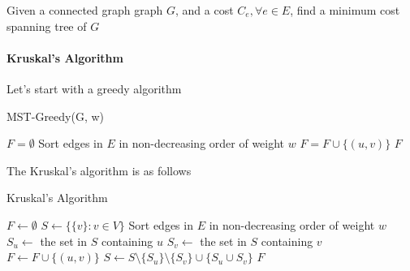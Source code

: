                 \begin{definition}
                    Given a connected graph graph $G$, and a cost $C_e, \forall e\in E$, find a minimum cost spanning tree of $G$
                \end{definition}

            \paragraph{Kruskal's Algorithm}
                Let's start with a greedy algorithm

                \begin{algorithm}[H]
                    \caption{MST-Greedy(G, w)}
                    \begin{algorithmic}[1]
                        \State $F = \emptyset$
                        \State Sort edges in $E$ in non-decreasing order of weight $w$
                                \State $F = F \cup \{(u, v)\}$
                            \EndIf
                        \EndFor
                        \State \Return $F$
                    \end{algorithmic}
                \end{algorithm}


                The Kruskal's algorithm is as follows
                \begin{algorithm}[H]
                    \caption{Kruskal's Algorithm}
                    \begin{algorithmic}
                        \State $F \gets \emptyset$
                        \State $S \gets \{\{v\}: v \in V\}$
                        \State Sort edges in $E$ in non-decreasing order of weight $w$
                            \State $S_u \gets$ the set in $S$ containing $u$
                            \State $S_v \gets$ the set in $S$ containing $v$
                                \State $F \gets F \cup \{(u, v)\}$
                                \State $S \gets S \setminus \{S_u\} \setminus \{S_v\} \cup \{S_u \cup S_v\}$
                            \EndIf
                        \EndFor
                        \State \Return $F$
                    \end{algorithmic}
                \end{algorithm}

